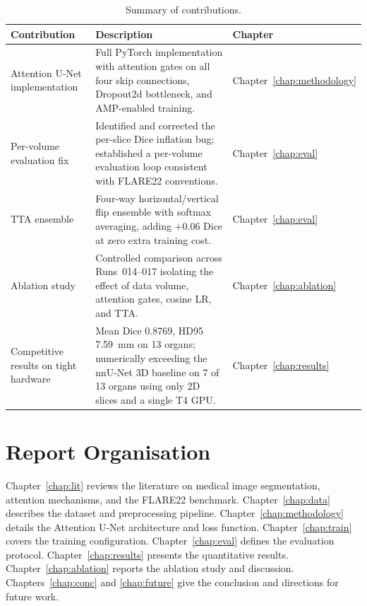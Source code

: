 \begin{table}[h!]
\centering
\caption{Summary of contributions.}
\label{tab:contributions}
\begin{tabular}{p{3.5cm} p{7cm} p{2.5cm}}
\toprule
\textbf{Contribution} & \textbf{Description} & \textbf{Chapter} \\
\midrule
Attention U-Net implementation &
  Full PyTorch implementation with attention gates on all four skip connections, Dropout2d
  bottleneck, and AMP-enabled training. &
  Chapter~\ref{chap:methodology} \\[6pt]
Per-volume evaluation fix &
  Identified and corrected the per-slice Dice inflation bug; established a per-volume evaluation
  loop consistent with FLARE22 conventions. &
  Chapter~\ref{chap:eval} \\[6pt]
TTA ensemble &
  Four-way horizontal/vertical flip ensemble with softmax averaging, adding $+$0.06 Dice at zero
  extra training cost. &
  Chapter~\ref{chap:eval} \\[6pt]
Ablation study &
  Controlled comparison across Runs~014--017 isolating the effect of data volume, attention gates,
  cosine LR, and TTA. &
  Chapter~\ref{chap:ablation} \\[6pt]
Competitive results on tight hardware &
  Mean Dice 0.8769, HD95 7.59~mm on 13 organs; numerically exceeding the nnU-Net 3D baseline
  on 7 of 13 organs using only 2D slices and a single T4 GPU. &
  Chapter~\ref{chap:results} \\
\bottomrule
\end{tabular}
\end{table}

\section{Report Organisation}

Chapter~\ref{chap:lit} reviews the literature on medical image segmentation, attention mechanisms,
and the FLARE22 benchmark. Chapter~\ref{chap:data} describes the dataset and preprocessing
pipeline. Chapter~\ref{chap:methodology} details the Attention U-Net architecture and loss
function. Chapter~\ref{chap:train} covers the training configuration. Chapter~\ref{chap:eval}
defines the evaluation protocol. Chapter~\ref{chap:results} presents the quantitative results.
Chapter~\ref{chap:ablation} reports the ablation study and discussion. Chapters~\ref{chap:conc}
and \ref{chap:future} give the conclusion and directions for future work.
